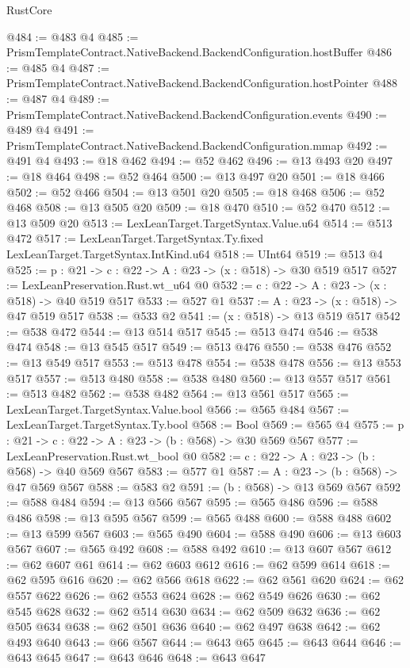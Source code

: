\begin{lexlean}{RustCore}
\begin{coremodule}
@484 := @483 @4
@485 := PrismTemplateContract.NativeBackend.BackendConfiguration.hostBuffer
@486 := @485 @4
@487 := PrismTemplateContract.NativeBackend.BackendConfiguration.hostPointer
@488 := @487 @4
@489 := PrismTemplateContract.NativeBackend.BackendConfiguration.events
@490 := @489 @4
@491 := PrismTemplateContract.NativeBackend.BackendConfiguration.mmap
@492 := @491 @4
@493 := @18 @462
@494 := @52 @462
@496 := @13 @493 @20
@497 := @18 @464
@498 := @52 @464
@500 := @13 @497 @20
@501 := @18 @466
@502 := @52 @466
@504 := @13 @501 @20
@505 := @18 @468
@506 := @52 @468
@508 := @13 @505 @20
@509 := @18 @470
@510 := @52 @470
@512 := @13 @509 @20
@513 := LexLeanTarget.TargetSyntax.Value.u64
@514 := @513 @472
@517 := LexLeanTarget.TargetSyntax.Ty.fixed LexLeanTarget.TargetSyntax.IntKind.u64
@518 := UInt64
@519 := @513 @4
@525 := {p : @21} -> {c : @22} -> {A : @23} -> (x : @518) -> @30 @519 @517
@527 := LexLeanPreservation.Rust.wt_u64 @0
@532 := {c : @22} -> {A : @23} -> (x : @518) -> @40 @519 @517
@533 := @527 @1
@537 := {A : @23} -> (x : @518) -> @47 @519 @517
@538 := @533 @2
@541 := (x : @518) -> @13 @519 @517
@542 := @538 @472
@544 := @13 @514 @517
@545 := @513 @474
@546 := @538 @474
@548 := @13 @545 @517
@549 := @513 @476
@550 := @538 @476
@552 := @13 @549 @517
@553 := @513 @478
@554 := @538 @478
@556 := @13 @553 @517
@557 := @513 @480
@558 := @538 @480
@560 := @13 @557 @517
@561 := @513 @482
@562 := @538 @482
@564 := @13 @561 @517
@565 := LexLeanTarget.TargetSyntax.Value.bool
@566 := @565 @484
@567 := LexLeanTarget.TargetSyntax.Ty.bool
@568 := Bool
@569 := @565 @4
@575 := {p : @21} -> {c : @22} -> {A : @23} -> (b : @568) -> @30 @569 @567
@577 := LexLeanPreservation.Rust.wt_bool @0
@582 := {c : @22} -> {A : @23} -> (b : @568) -> @40 @569 @567
@583 := @577 @1
@587 := {A : @23} -> (b : @568) -> @47 @569 @567
@588 := @583 @2
@591 := (b : @568) -> @13 @569 @567
@592 := @588 @484
@594 := @13 @566 @567
@595 := @565 @486
@596 := @588 @486
@598 := @13 @595 @567
@599 := @565 @488
@600 := @588 @488
@602 := @13 @599 @567
@603 := @565 @490
@604 := @588 @490
@606 := @13 @603 @567
@607 := @565 @492
@608 := @588 @492
@610 := @13 @607 @567
@612 := @62 @607 @61
@614 := @62 @603 @612
@616 := @62 @599 @614
@618 := @62 @595 @616
@620 := @62 @566 @618
@622 := @62 @561 @620
@624 := @62 @557 @622
@626 := @62 @553 @624
@628 := @62 @549 @626
@630 := @62 @545 @628
@632 := @62 @514 @630
@634 := @62 @509 @632
@636 := @62 @505 @634
@638 := @62 @501 @636
@640 := @62 @497 @638
@642 := @62 @493 @640
@643 := @66 @567
@644 := @643 @65
@645 := @643 @644
@646 := @643 @645
@647 := @643 @646
@648 := @643 @647

\end{coremodule}
\end{lexlean}
